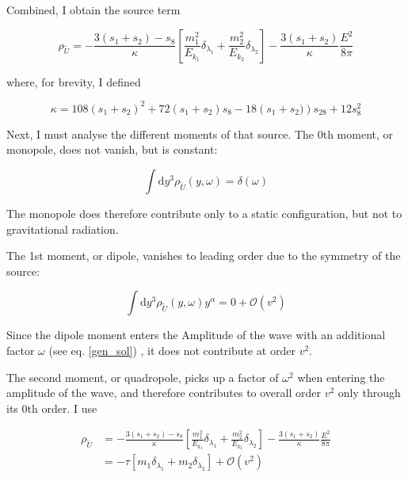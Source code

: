 \documentclass[11pt]{article}
\begin{document}
Combined, I obtain the source term

\begin{equation}
	\rho_{\tilde U} = 
	- \frac{3 \left( s_1 + s_2\right) - s_8 }{\kappa}
	\left[
	\frac{m_1^2}{E_{k_1}} \delta_{\lambda_1}
	+
	\frac{m_2^2}{E_{k_2}} \delta_{\lambda_2}
	\right]
	-\frac{3 \left( s_1 + s_2 \right)}{\kappa} \frac{E^2}{8 \pi}
\end{equation}

where, for brevity, I defined

\begin{equation}
	\kappa = 108 \left(s_1 + s_2 \right)^2
	+ 72 \left(s_1 + s_2 \right) s_8
	- 18 \left(s_1 + s_2)\right) s_{28}
	+ 12 s_8^2
\end{equation}

Next, I must analyse the different moments of that source. The 0th moment, or monopole, does not vanish, but is constant:

\begin{equation}
	\int \mathrm{d} y^3 \rho_{\tilde U} \left( y, \omega \right) 
	=
	\delta \left( \omega \right)
\end{equation}

The monopole does therefore contribute only to a static configuration, but not to gravitational radiation.

The 1st moment, or dipole, vanishes to leading order due to the symmetry of the source:

\begin{equation}
	\int \mathrm{d} y^3 \rho_{\tilde U} \left( y, \omega \right) y^\alpha
	=
	0 + \mathcal{O} \left( v^2  \right)
\end{equation} 

Since the dipole moment enters the Amplitude of the wave with an additional factor $\omega$ (see eq. \ref{gen_sol}) , it does not contribute at order $v^2$.

The second moment, or quadropole, picks up a factor of $\omega^2$ when entering the amplitude of the wave, and therefore contributes to overall order $v^2$ only through its 0th order. I use 

\begin{align}
	\rho_{\tilde U} &= 
	- \frac{3 \left( s_1 + s_2\right) - s_8 }{\kappa}
	\left[
	\frac{m_1^2}{E_{k_1}} \delta_{\lambda_1}
	+
	\frac{m_2^2}{E_{k_2}} \delta_{\lambda_2}
	\right]
	-\frac{3 \left( s_1 + s_2 \right)}{\kappa} \frac{E^2}{8 \pi}
	\\
	&= 
	- \tau
	\left[
	m_1 \delta_{\lambda_1}
	+
	m_2 \delta_{\lambda_2}
	\right]
	+
	\mathcal{O} \left( v^2  \right)
\end{align}
\end{document}
